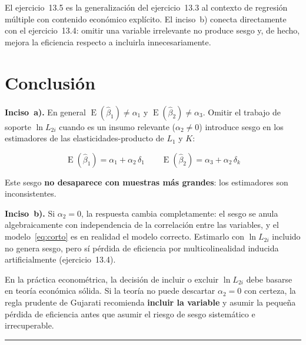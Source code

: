 \documentclass[12pt, letterpaper]{article}
\newcommand{\E}{\operatorname{E}}
\begin{document}
El ejercicio~13.5 es la generalización del ejercicio~13.3 al contexto de
regresión múltiple con contenido económico explícito. El inciso~b) conecta
directamente con el ejercicio~13.4: omitir una variable irrelevante no
produce sesgo y, de hecho, mejora la eficiencia respecto a incluirla
innecesariamente.

\section{Conclusión}

\begin{clave}
  \textbf{Inciso~a).} En general $\E(\hat{\beta}_1) \neq \alpha_1$ y
  $\E(\hat{\beta}_2) \neq \alpha_3$. Omitir el trabajo de soporte
  $\ln L_{2i}$ cuando es un insumo relevante ($\alpha_2 \neq 0$) introduce
  sesgo en los estimadores de las elasticidades-producto de $L_1$ y $K$:

  \begin{equation*}
    \E(\hat{\beta}_1) = \alpha_1 + \alpha_2\,\delta_1 \qquad
    \E(\hat{\beta}_2) = \alpha_3 + \alpha_2\,\delta_k
  \end{equation*}

  Este sesgo \textbf{no desaparece con muestras más grandes}: los
  estimadores son inconsistentes.

  \bigskip

  \textbf{Inciso~b).} Si $\alpha_2 = 0$, la respuesta cambia
  completamente: el sesgo se anula algebraicamente con independencia de
  la correlación entre las variables, y el modelo~\eqref{eq:corto} es en
  realidad el modelo correcto. Estimarlo con $\ln L_{2i}$ incluido no
  genera sesgo, pero sí pérdida de eficiencia por multicolinealidad
  inducida artificialmente (ejercicio~13.4).

  \bigskip

  En la práctica econométrica, la decisión de incluir o excluir
  $\ln L_{2i}$ debe basarse en teoría económica sólida. Si la teoría no
  puede descartar $\alpha_2 = 0$ con certeza, la regla prudente de
  Gujarati recomienda \textbf{incluir la variable} y asumir la pequeña
  pérdida de eficiencia antes que asumir el riesgo de sesgo sistemático
  e irrecuperable.
\end{clave}

\vspace{14pt}
\noindent\rule{\linewidth}{0.4pt}
\end{document}
